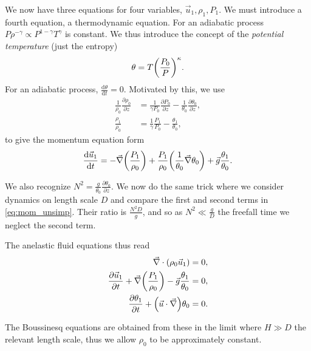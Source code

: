 \documentclass[11pt,
        usenames, %
        dvipsnames %
    ]{report}
\newcommand*{\rd}[2]{\frac{\mathrm{d}#1}{\mathrm{d}#2}}
\newcommand*{\pd}[2]{\frac{\partial#1}{\partial#2}}
\DeclarePairedDelimiter\p{\lparen}{\rparen}
\begin{document}
We now have three equations for four variables, $\vec{u}_1, \rho_1, P_1$. We
must introduce a fourth equation, a thermodynamic equation. For an adiabatic
process $P\rho^{-\gamma} \propto P^{1-\gamma}T^\gamma$ is constant. We thus
introduce the concept of the \emph{potential temperature} (just the entropy)
\begin{equation}
    \theta = T\p*{\frac{P_0}{P}}^\kappa.
        \label{eq:pot_temp}
\end{equation}
For an adiabatic process, $\rd{\theta}{t} = 0$. Motivated by this, we use
\begin{equation}
    \begin{split}
        \frac{1}{\rho_0}\pd{\rho_0}{z} &= \frac{1}{\gamma P_0}\pd{P_0}{z}
            - \frac{1}{\theta_0}\pd{\theta_0}{z},\\
        \frac{\rho_1}{\rho_0} &= \frac{1}{\gamma} \frac{P_1}{P_0}
            - \frac{\theta_1}{\theta_0},
    \end{split}
\end{equation}
to give the momentum equation form
\begin{equation}
    \rd{\vec{u}_1}{t} = -\vec{\nabla}\p*{\frac{P_1}{\rho_0}}
        + \frac{P_1}{\rho_0}\p*{\frac{1}{\theta_0}\vec{\nabla}\theta_0}
        + \vec{g} \frac{\theta_1}{\theta_0}.\label{eq:mom_unsimp}
\end{equation}

We also recognize $N^2 = \frac{g}{\theta_0}\pd{\theta_0}{z}$. We now do the same
trick where we consider dynamics on length scale $D$ and compare the first and
second terms in \autoref{eq:mom_unsimp}. Their ratio is $\frac{N^2 D}{g}$, and
so as $N^2 \ll \frac{g}{D}$ the freefall time we neglect the second term.

The anelastic fluid equations thus read
\begin{equation}
    \begin{split}
        \vec{\nabla} \cdot \p*{\rho_0\vec{u}_1} &= 0,\\
        \pd{\vec{u}_1}{t} + \vec{\nabla}\p*{\frac{P_1}{\rho_0}}
            - \vec{g}\frac{\theta_1}{\theta_0} &= 0,\\
        \pd{\theta_1}{t} + \p*{\vec{u} \cdot \vec{\nabla}}\theta_0 &= 0.
    \end{split}\label{eq:lin_anelastic}
\end{equation}

The Boussinesq equations are obtained from these in the limit where $H \gg D$
the relevant length scale, thus we allow $\rho_0$ to be approximately constant.
\end{document}
